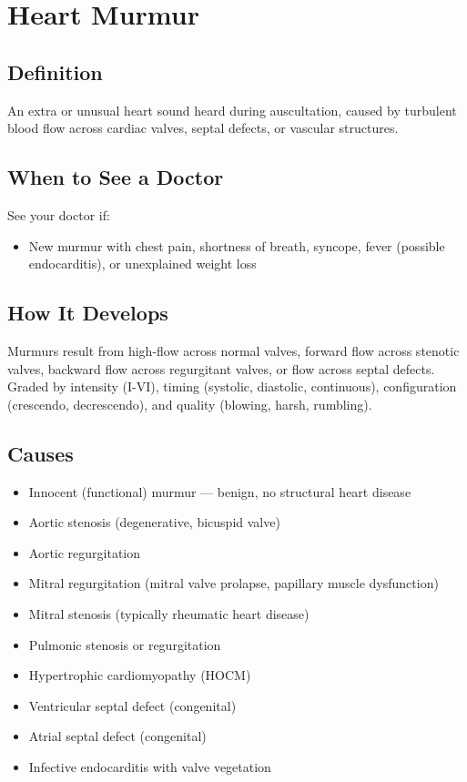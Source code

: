 \chapter{Heart Murmur}

\section*{Definition}
An extra or unusual heart sound heard during auscultation, caused by turbulent blood flow across cardiac valves, septal defects, or vascular structures.

\section*{When to See a Doctor}
See your doctor if:
\begin{itemize}
  \item New murmur with chest pain, shortness of breath, syncope, fever (possible endocarditis), or unexplained weight loss
\end{itemize}

\section*{How It Develops}
Murmurs result from high-flow across normal valves, forward flow across stenotic valves, backward flow across regurgitant valves, or flow across septal defects. Graded by intensity (I-VI), timing (systolic, diastolic, continuous), configuration (crescendo, decrescendo), and quality (blowing, harsh, rumbling).

\section*{Causes}
\begin{itemize}
  \item Innocent (functional) murmur — benign, no structural heart disease
  \item Aortic stenosis (degenerative, bicuspid valve)
  \item Aortic regurgitation
  \item Mitral regurgitation (mitral valve prolapse, papillary muscle dysfunction)
  \item Mitral stenosis (typically rheumatic heart disease)
  \item Pulmonic stenosis or regurgitation
  \item Hypertrophic cardiomyopathy (HOCM)
  \item Ventricular septal defect (congenital)
  \item Atrial septal defect (congenital)
  \item Infective endocarditis with valve vegetation
\end{itemize}

